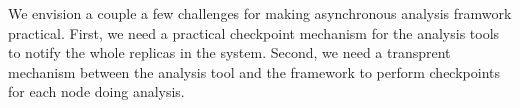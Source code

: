 We envision a couple a few challenges for making asynchronous analysis framwork 
practical. First, we need a practical checkpoint mechanism for the analysis 
tools to notify the whole replicas in the system. Second, we need a transprent 
mechanism between the analysis tool and the framework to perform checkpoints for 
each node doing analysis.


